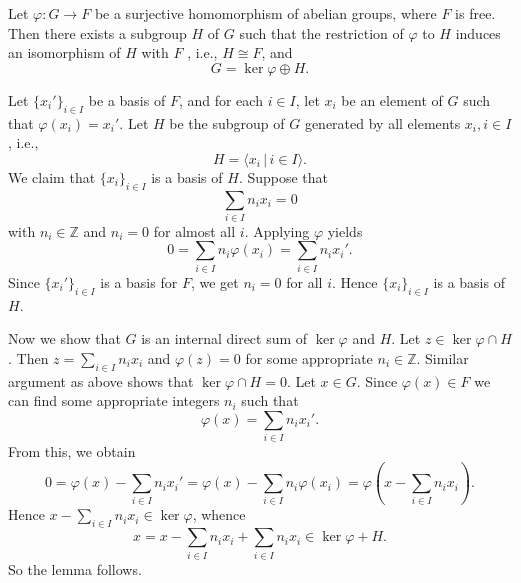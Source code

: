 \begin{lemma} \label{lemma-FGAG}
	Let $\varphi:G \to F$ be a surjective homomorphism of abelian groups, where $F$ is free.  Then there exists a subgroup $H$ of $G$ such that the restriction of $\varphi$ to $H$ induces an isomorphism of $H$ with $F$ , i.e., $H\cong F$, and $$G = \ker \varphi \oplus H.$$
\end{lemma}
\begin{sketch}
	Let $\{x_i'\}_{i \in I}$ be a basis of $F$, and for each $i \in I$, let $x_i$ be an element of $G$ such that $\varphi(x_i) = x_i'$. Let $H$ be the subgroup of $G$ generated by all elements $x_i, i \in I$, i.e., \begin{equation*}
		H = \langle x_i \,|\, i\in I \rangle.
	\end{equation*} We claim that $\{x_i\}_{i\in I}$ is a basis of $H$. Suppose that
	\begin{equation*}
		\sum_{i \in I} n_i x_i = 0
	\end{equation*}
	with $n_i\in\mathbb{Z}$ and $n_i = 0$ for almost all $i$. Applying $\varphi$ yields
	\begin{equation*}
		0 = \sum_{i \in I} n_i \varphi(x_i) = \sum_{i \in I} n_i x_i'.
	\end{equation*}
	Since $\{x_i'\}_{i \in I}$ is a basis for $F$, we get $n_i = 0$ for all $i$. Hence  $\{x_i\}_{i \in I}$ is a basis of $H$. 
	
	Now we show that $G$ is an internal direct sum of $\ker \varphi$ and $H$. Let $z \in \ker \varphi \cap H$. Then $z = \sum_{i\in I}n_ix_i$ and $\varphi(z) = 0$ for some appropriate $n_i\in \mathbb{Z}$. Similar argument as above shows that $\ker \varphi \cap H = 0$. Let $x \in G$. Since $\varphi(x) \in F$ we can find some appropriate integers $n_i$ such that
	\begin{equation*}
		\varphi(x) = \sum_{i \in I} n_i x_i'.
	\end{equation*}
	From this, we obtain
	\begin{equation*}
		0=\varphi(x) -  \sum_{i \in I} n_i x_i' = \varphi(x) -  \sum_{i \in I} n_i \varphi(x_i) = \varphi\left(x - \sum_{i \in I} n_i x_i\right).
	\end{equation*}
	Hence $x - \sum_{i \in I} n_i x_i \in \ker\varphi$, whence
	\begin{equation*}
		x = x -  \sum_{i \in I} n_i x_i +  \sum_{i \in I} n_i x_i \in \ker \varphi + H.
	\end{equation*}  So the lemma follows.
\end{sketch}

